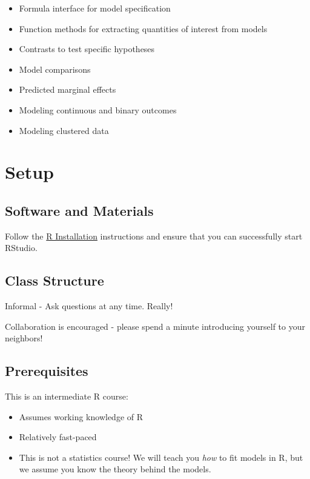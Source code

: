 \documentclass[
]{book}
\providecommand{\tightlist}{%
  \setlength{\itemsep}{0pt}\setlength{\parskip}{0pt}}
\begin{document}
\begin{itemize}
\tightlist
\item
  Formula interface for model specification
\item
  Function methods for extracting quantities of interest from models
\item
  Contrasts to test specific hypotheses
\item
  Model comparisons
\item
  Predicted marginal effects
\item
  Modeling continuous and binary outcomes
\item
  Modeling clustered data
\end{itemize}

\hypertarget{setup-1}{%
\section{Setup}\label{setup-1}}

\hypertarget{software-and-materials-1}{%
\subsection{Software and Materials}\label{software-and-materials-1}}

Follow the \href{./Rinstall.html}{R Installation} instructions and ensure that you can successfully start RStudio.

\hypertarget{class-structure-1}{%
\subsection{Class Structure}\label{class-structure-1}}

Informal - Ask questions at any time. Really!

Collaboration is encouraged - please spend a minute introducing yourself to your neighbors!

\hypertarget{prerequisites-1}{%
\subsection{Prerequisites}\label{prerequisites-1}}

This is an intermediate R course:

\begin{itemize}
\tightlist
\item
  Assumes working knowledge of R
\item
  Relatively fast-paced
\item
  This is not a statistics course! We will teach you \emph{how} to fit models in R,
  but we assume you know the theory behind the models.
\end{itemize}
\end{document}
